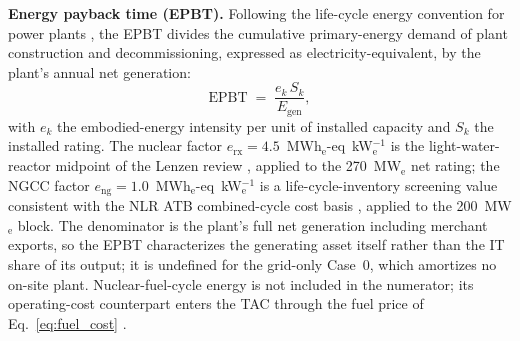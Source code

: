 \documentclass[a4paper,fleqn]{cas-sc}
\newcommand{\runinhead}[1]{\par\smallskip\noindent\textbf{#1.}\quad}
\begin{document}
\runinhead{Energy payback time (EPBT)}
Following the life-cycle energy convention for power plants \citep{lenzen2008nuclear}, the EPBT divides the cumulative primary-energy demand of plant construction and decommissioning, expressed as electricity-equivalent, by the plant's annual net generation:
\begin{equation}
\label{eq:epbt}
\mathrm{EPBT} \;=\; \frac{e_k\, S_k}{E_\mathrm{gen}},
\end{equation}
with $e_k$ the embodied-energy intensity per unit of installed capacity and $S_k$ the installed rating. The nuclear factor $e_\mathrm{rx}=4.5$~MWh$_\mathrm{e}$-eq~kW$_\mathrm{e}^{-1}$ is the light-water-reactor midpoint of the Lenzen review \citep{lenzen2008nuclear}, applied to the 270~MW$_\mathrm{e}$ net rating; the NGCC factor $e_\mathrm{ng}=1.0$~MWh$_\mathrm{e}$-eq~kW$_\mathrm{e}^{-1}$ is a life-cycle-inventory screening value consistent with the NLR ATB combined-cycle cost basis \citep{atb2024nuclear}, applied to the 200~MW$_\mathrm{e}$ block. The denominator is the plant's full net generation including merchant exports, so the EPBT characterizes the generating asset itself rather than the IT share of its output; it is undefined for the grid-only Case~0, which amortizes no on-site plant. Nuclear-fuel-cycle energy is not included in the numerator; its operating-cost counterpart enters the TAC through the fuel price of Eq.~\eqref{eq:fuel_cost} \citep{li2026nuclearH2}.
\end{document}
